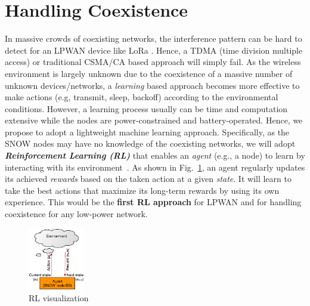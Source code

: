 


\section{Handling Coexistence}\label{sec:coexistence}
  


 

In massive crowds of coexisting networks, the interference pattern can be hard to detect for an LPWAN device like LoRa .  Hence, a TDMA (time division multiple access) or traditional CSMA/CA based approach will simply fail. As the wireless environment is largely unknown due to the coexistence of a massive number of unknown devices/networks,  a {\slshape learning} based approach becomes more effective to make actions (e.g, transmit, sleep, backoff) according to the environmental conditions. However, a learning process usually can be time and computation extensive while the nodes are power-constrained and battery-operated. Hence, we propose to adopt a lightweight machine learning approach. Specifically, as the SNOW nodes may have no knowledge of the coexisting networks, we will adopt  {\bf\slshape Reinforcement Learning (RL)} that enables an {\slshape agent} (e.g., a node) to learn by interacting with its environment~\cite{RLBook}. As shown in Fig.~\ref{fig:reinforcement}, an agent regularly updates its achieved {\slshape rewards} based on the taken action at a given {\slshape state}.  It will learn to take the best actions that maximize its long-term rewards by using its own experience. This would be the {\bf first RL approach} for LPWAN and for handling coexistence for any low-power network. 



 
    \begin{figure}%
    \centering%
    \includegraphics[width=0.22\textwidth]{figs/reinforcement.eps}      
    \vspace{-0.05in}
    \caption{\scriptsize RL visualization}\vspace{-0.1in}
    \label{fig:reinforcement}
 \end{figure}
 
